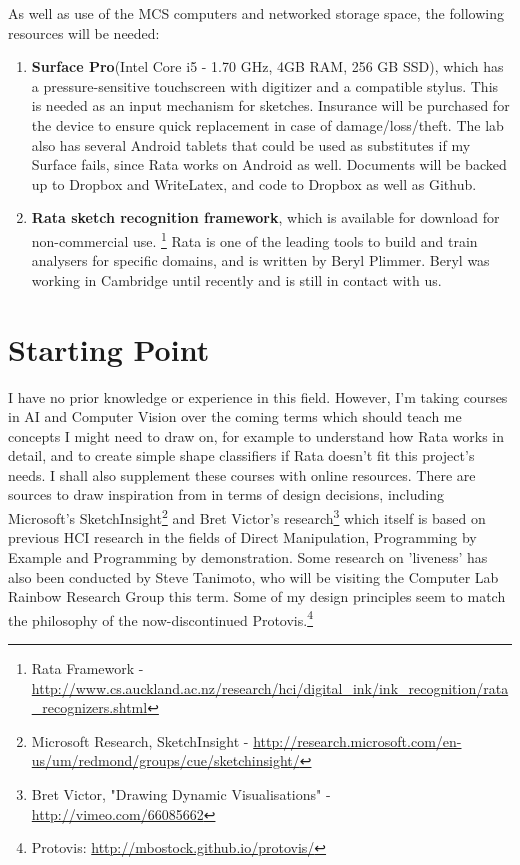 As well as use of the MCS computers and networked storage space, the following resources will be needed:
\begin{enumerate}

\item {\bf Surface Pro}(Intel Core i5 - 1.70 GHz, 4GB RAM, 256 GB SSD), which has a pressure-sensitive touchscreen with digitizer and a compatible stylus. This is needed as an input mechanism for sketches. Insurance will be purchased for the device to ensure quick replacement in case of damage/loss/theft. The lab also has several Android tablets that could be used as substitutes if my Surface fails, since Rata works on Android as well. Documents will be backed up to Dropbox and WriteLatex, and code to Dropbox as well as Github.
 
\item {\bf Rata sketch recognition framework}, which is available for download for non-commercial use. 
\footnote{Rata Framework - \url{http://www.cs.auckland.ac.nz/research/hci/digital_ink/ink_recognition/rata_recognizers.shtml}} Rata is one of the leading tools to build and train analysers for specific domains, and is written by Beryl Plimmer. Beryl was working in Cambridge until recently and is still in contact with us.
\end{enumerate}










\section*{Starting Point}
I have no prior knowledge or experience in this field. However, I'm taking courses in AI and Computer Vision over the coming terms which should teach me concepts I might need to draw on, for example to understand how Rata works in detail, and to create simple shape classifiers if Rata doesn't fit this project's needs. I shall also supplement these courses with online resources. There are sources to draw inspiration from in terms of design decisions,  including Microsoft's SketchInsight\footnote{Microsoft Research, SketchInsight - \url{http://research.microsoft.com/en-us/um/redmond/groups/cue/sketchinsight/}} and Bret Victor's research\footnote{Bret Victor, "Drawing Dynamic Visualisations" - \url{http://vimeo.com/66085662}} which itself is based on previous HCI research in the fields of Direct Manipulation, Programming by Example and Programming by demonstration. Some research on 'liveness' has also been conducted by Steve Tanimoto, who will be visiting the Computer Lab Rainbow Research Group this  term. Some of my design principles seem to match the philosophy of the now-discontinued Protovis.\footnote{Protovis: \url{http://mbostock.github.io/protovis/}} 

